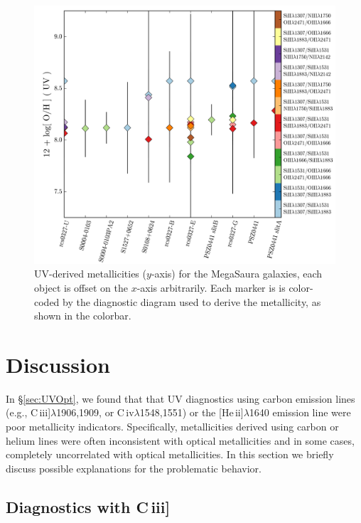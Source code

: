 \documentclass[preprint2]{aastex62}
\newcommand{\heii}{[He\,{\sc ii}]\xspace}
\newcommand{\civ}{C\,{\sc iv}\xspace}
\newcommand{\ciii}{C\,{\sc iii}]\xspace}
\newcommand{\mage}{{\sc Meg}a{\sc S}a{\sc ura}\xspace}
\begin{document}
\begin{figure}
  \begin{center}
    \includegraphics[width=\linewidth]{figs/f8.png}
    \caption{UV-derived metallicities ($y$-axis) for the \mage galaxies, each object is offset on the $x$-axis arbitrarily. Each marker is is color-coded by the diagnostic diagram used to derive the metallicity, as shown in the colorbar. }
    \label{fig:UVmage}
  \end{center}
\end{figure}


\section{Discussion}\label{sec:discussion}

In \S\ref{sec:UVOpt}, we found that that UV diagnostics using carbon emission lines (e.g., \ciii$\lambda$1906,1909, or \civ$\lambda$1548,1551) or the \heii$\lambda$1640 emission line were poor metallicity indicators. Specifically, metallicities derived using carbon or helium lines were often inconsistent with optical metallicities and in some cases, completely uncorrelated with optical metallicities. In this section we briefly discuss possible explanations for the problematic behavior.

\subsection{Diagnostics with \ciii}
\end{document}
